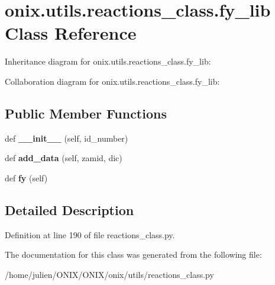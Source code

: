 \hypertarget{classonix_1_1utils_1_1reactions__class_1_1fy__lib}{}\section{onix.\+utils.\+reactions\+\_\+class.\+fy\+\_\+lib Class Reference}
\label{classonix_1_1utils_1_1reactions__class_1_1fy__lib}


Inheritance diagram for onix.\+utils.\+reactions\+\_\+class.\+fy\+\_\+lib\+:


Collaboration diagram for onix.\+utils.\+reactions\+\_\+class.\+fy\+\_\+lib\+:
\subsection*{Public Member Functions}
\begin{DoxyCompactItemize}
\item 
\mbox{\label{classonix_1_1utils_1_1reactions__class_1_1fy__lib_a2b189a93d6fc2b0532174e8de70df363}} 
def {\bfseries \+\_\+\+\_\+init\+\_\+\+\_\+} (self, id\+\_\+number)
\item 
\mbox{\label{classonix_1_1utils_1_1reactions__class_1_1fy__lib_abc9ac58fa55a7a6d6f5f376a4c031709}} 
def {\bfseries add\+\_\+data} (self, zamid, dic)
\item 
\mbox{\label{classonix_1_1utils_1_1reactions__class_1_1fy__lib_a91ceff818d1a4fee095ca1c12affb527}} 
def {\bfseries fy} (self)
\end{DoxyCompactItemize}


\subsection{Detailed Description}


Definition at line 190 of file reactions\+\_\+class.\+py.



The documentation for this class was generated from the following file\+:\begin{DoxyCompactItemize}
\item 
/home/julien/\+O\+N\+I\+X/\+O\+N\+I\+X/onix/utils/reactions\+\_\+class.\+py\end{DoxyCompactItemize}
